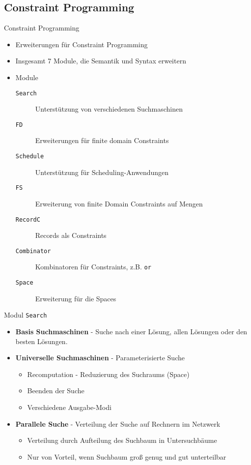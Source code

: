 \subsection{Constraint Programming}
\begin{frame}{Constraint Programming}
  \begin{itemize}
    \item Erweiterungen für Constraint Programming
    \item Insgesamt 7 Module, die Semantik und Syntax erweitern
    \item Module
    \begin{description}
      \item[\texttt{Search}] Unterstützung von verschiedenen Suchmaschinen
      \item[\texttt{FD}] Erweiterungen für finite domain Constraints
      \item[\texttt{Schedule}] Unterstützung für Scheduling-Anwendungen
      \item[\texttt{FS}] Erweiterung von finite Domain Constraints auf Mengen
      \item[\texttt{RecordC}] Records als Constraints
      \item[\texttt{Combinator}] Kombinatoren für Constraints, z.B. \texttt{or}
      \item[\texttt{Space}] Erweiterung für die Spaces
    \end{description}
  \end{itemize}
\end{frame}

\begin{frame}{Modul \texttt{Search}}
  \begin{itemize}
    \item \textbf{Basis Suchmaschinen} - Suche nach einer Lösung, allen Lösungen oder
    den besten Lösungen.
    \item \textbf{Universelle Suchmaschinen} - Parameterisierte Suche
    \begin{itemize}
      \item Recomputation - Reduzierung des Suchraums (Space)
      \item Beenden der Suche
      \item Verschiedene Ausgabe-Modi
    \end{itemize}
    \item \textbf{Parallele Suche} - Verteilung der Suche auf Rechnern im Netzwerk
    \begin{itemize}
      \item Verteilung durch Aufteilung des Suchbaum in Untersuchbäume
      \item Nur von Vorteil, wenn Suchbaum groß genug und gut unterteilbar
    \end{itemize}
  \end{itemize}
\end{frame}

